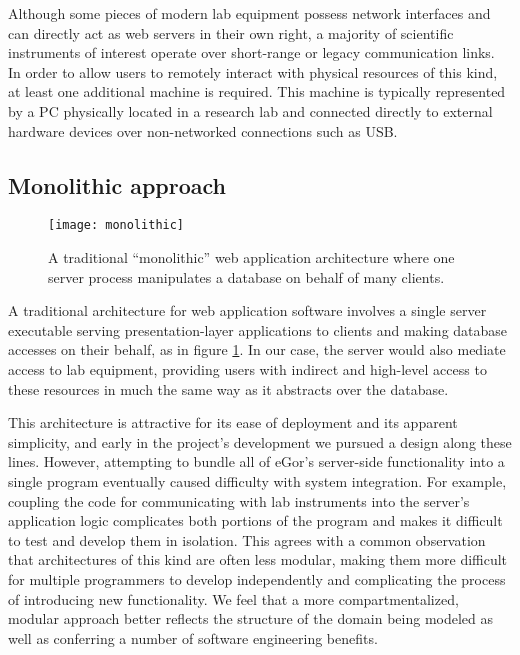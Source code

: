 \documentclass[../thesis]{subfiles}
\begin{document}
Although some pieces of modern lab equipment possess network interfaces
and can directly act as web servers in their own right, a majority of
scientific instruments of interest operate over short-range or legacy
communication links. In order to allow users to remotely interact with
physical resources of this kind, at least one additional machine is
required. This machine is typically represented by a PC physically
located in a research lab and connected directly to external hardware
devices over non-networked connections such as USB.

\subsection{Monolithic approach}
\begin{figure}
  \texttt{[image: monolithic]}
  \caption{
    A traditional ``monolithic'' web application architecture where
    one server process manipulates a database on behalf of many clients.
    \label{fig:Monolithic}
  }
\end{figure}

A traditional architecture for web application software involves a
single server executable serving presentation-layer applications to
clients and making database accesses on their behalf, as in figure
\ref{fig:Monolithic}. In our case, the server would also mediate
access to lab equipment, providing users with indirect and high-level
access to these resources in much the same way as it abstracts over
the database.

This architecture is attractive for its ease of deployment and its
apparent simplicity, and early in the project's development we pursued
a design along these lines. However, attempting to bundle all of
eGor's server-side functionality into a single program eventually
caused difficulty with system integration. For example, coupling the
code for communicating with lab instruments into the server's
application logic complicates both portions of the program and makes
it difficult to test and develop them in isolation. This agrees with a
common observation \cite{Stephens:2015:BSE:2826034} that architectures
of this kind are often less modular, making them more difficult for
multiple programmers to develop independently and complicating the
process of introducing new functionality. We feel that a more
compartmentalized, modular approach better reflects the structure of
the domain being modeled as well as conferring a number of software
engineering benefits.
\end{document}
